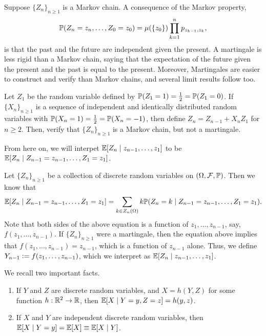Suppose $\{Z_{n}\}_{n \geq 1}$ is a Markov chain. A consequence of the Markov property,
\begin{align}
    \mathbb{P}(Z_{n}=z_{n},\ldots,Z_{0}=z_{0}) = \mu(\{z_{0}\}) \prod_{k=1}^{n} p_{z_{k-1},z_{k}},
\end{align}
is that the past and the future are independent given the present. A martingale is less rigid than a Markov chain, saying that the expectation of the future given the present and the past is equal to the present. Moreover, Martingales are easier to construct and verify than Markov chains, and several limit results follow too.

\begin{example}
    Let $Z_{1}$ be the random variable defined by $\mathbb{P}(Z_{1}=1) = \frac{1}{2} = \mathbb{P}(Z_{1}=0)$. If $\{X_{n}\}_{n \geq 1}$ is a sequence of independent and identically distributed random variables with $\mathbb{P}(X_{n}=1) = \frac{1}{2} = \mathbb{P}(X_{n}=-1)$, then define $Z_{n} = Z_{n-1} + X_{n}Z_{1}$ for $n \geq 2$. Then, verify that $\{Z_{n}\}_{n \geq 1}$ is a Markov chain, but not a martingale.
\end{example}

\noindent From here on, we will interpet $\mathbb{E}[Z_{n} \mid z_{n-1},\ldots,z_{1}]$ to be $\mathbb{E}[Z_{n} \mid Z_{n-1}=z_{n-1},\ldots,Z_{1}=z_{1}]$.

Let $\{Z_{n}\}_{n \geq 1}$ be a collection of discrete random variables on $(\Omega, \mathcal{F}, \mathbb{P})$. Then we know that
\begin{align}
    \mathbb{E}[Z_{n} \mid Z_{n-1}=z_{n-1},\ldots,Z_{1}=z_{1}] = \sum_{k \in Z_{n}(\Omega)} k \mathbb{P}(Z_{n}=k \mid Z_{n-1}=z_{n-1},\ldots,Z_{1}=z_{1}).
\end{align}
Note that both sides of the above equation is a function of $z_{1},\ldots,z_{n-1}$, say, $f(z_{1},\ldots,z_{n-1})$. If $\{Z_{n}\}_{n \geq 1}$ were a martingale, then the equation above implies that $f(z_{1},\ldots,z_{n-1}) = z_{n-1}$, which is a function of $z_{n-1}$ alone. Thus, we define $Y_{n-1} \vcentcolon= f(z_{1},\ldots,z_{n-1})$, which we interpret as $\mathbb{E}[Z_{n} \mid z_{n-1},\ldots,z_{1}]$.

\begin{remark}
    We recall two important facts.
    \begin{enumerate}
        \item If $Y$ and $Z$ are discrete random variables, and $X = h(Y,Z)$ for some function $h:\mathbb{R}^{2}\to \mathbb{R}$, then $\mathbb{E}[X \mid Y=y,Z=z] = h(y,z)$.
        \item If $X$ and $Y$ are independent discrete random variables, then $\mathbb{E}[X \mid Y=y] = \mathbb{E}[X] \equiv \mathbb{E}[X \mid Y]$.
    \end{enumerate}
\end{remark}

